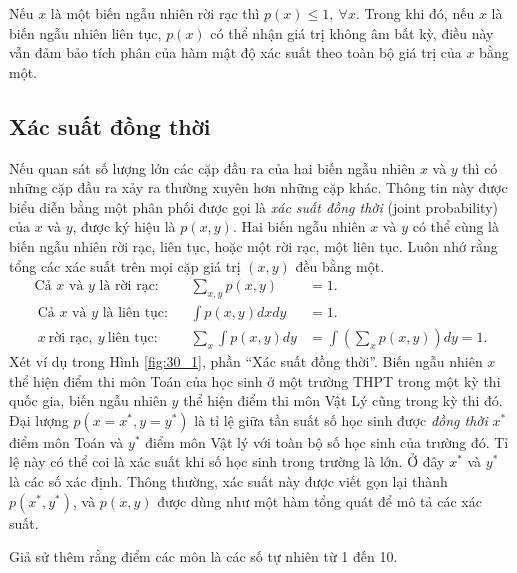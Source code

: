 \begin{mynote}
    Nếu $x$ là một biến ngẫu nhiên rời rạc thì $p(x) \leq 1,~\forall x$. Trong khi
    đó, nếu $x$ là biến ngẫu nhiên liên tục, $p(x)$ có thể nhận giá trị không âm
    bất kỳ, điều này vẫn đảm bảo tích phân của hàm mật độ xác suất theo toàn
    bộ giá trị của $x$ bằng một.    %
\end{mynote}


\subsection{Xác suất đồng thời}
Nếu quan sát số lượng lớn các cặp đầu ra của hai biến ngẫu nhiên $x$ và $y$ thì
có những cặp đầu ra xảy ra thường xuyên hơn những cặp khác. Thông tin này được
biểu diễn bằng một phân phối được gọi là \textit{xác suất đồng thời} (joint probability) của $x$ và
$y$, được ký hiệu là $p(x, y)$. Hai biến ngẫu nhiên $x$ và $y$ có thể cùng là
biến ngẫu nhiên rời rạc, liên tục, hoặc một rời rạc, một liên tục. Luôn nhớ rằng
tổng các xác suất trên mọi cặp giá trị $(x, y)$ đều bằng một.
\begin{align}
\text{Cả $x$ và $y$ là rời rạc:}  & &\sum_{x, y} p(x, y) &= 1. \\\
\text{Cả $x$ và $y$ là liên tục:} & &\int p(x, y) dx dy &=1.\\\
x ~\text{rời rạc}, ~ y ~\text{liên tục:} & &\sum_{x} \int p(x, y) dy &= \int \left(\sum_{x} p(x, y) \right)dy = 1.
\end{align}
Xét ví dụ trong Hình \ref{fig:30_1}, phần ``Xác suất đồng thời''. Biến ngẫu nhiên
$x$ thể hiện điểm thi môn Toán của học sinh ở một trường THPT trong một kỳ thi
quốc gia, biến ngẫu nhiên $y$ thể hiện điểm thi môn Vật Lý cũng trong kỳ thi đó.
Đại lượng $p(x = x^*, y = y^*)$ là tỉ lệ giữa tần suất số học sinh được
\textit{đồng thời} $x^*$ điểm môn Toán và $y^*$ điểm môn Vật lý với
toàn bộ số học sinh của trường đó. Tỉ lệ này có thể coi là xác suất khi số học
sinh trong trường là lớn. Ở đây $x^*$ và $y^*$ là các số xác định. Thông thường,
xác suất này được viết gọn lại thành $p(x^*, y^*)$, và $p(x, y)$ được dùng như
một hàm tổng quát để mô tả các xác suất. 

Giả sử thêm rằng điểm các môn là các số tự nhiên từ 1 đến 10.

